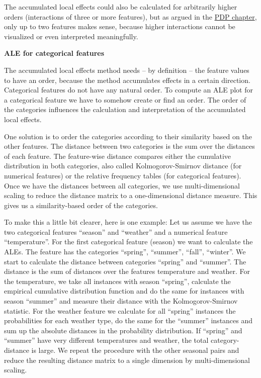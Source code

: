 \documentclass[
  12pt,
]{krantz}
\begin{document}
The accumulated local effects could also be calculated for arbitrarily higher orders (interactions of three or more features), but as argued in the \protect\hyperlink{pdp}{PDP chapter}, only up to two features makes sense, because higher interactions cannot be visualized or even interpreted meaningfully.

\textbf{ALE for categorical features}

The accumulated local effects method needs -- by definition -- the feature values to have an order, because the method accumulates effects in a certain direction.
Categorical features do not have any natural order.
To compute an ALE plot for a categorical feature we have to somehow create or find an order.
The order of the categories influences the calculation and interpretation of the accumulated local effects.

One solution is to order the categories according to their similarity based on the other features.
The distance between two categories is the sum over the distances of each feature.
The feature-wise distance compares either the cumulative distribution in both categories, also called Kolmogorov-Smirnov distance (for numerical features) or the relative frequency tables (for categorical features).
Once we have the distances between all categories, we use multi-dimensional scaling to reduce the distance matrix to a one-dimensional distance measure.
This gives us a similarity-based order of the categories.

To make this a little bit clearer, here is one example:
Let us assume we have the two categorical features ``season'' and ``weather'' and a numerical feature ``temperature''.
For the first categorical feature (season) we want to calculate the ALEs.
The feature has the categories ``spring'', ``summer'', ``fall'', ``winter''.
We start to calculate the distance between categories ``spring'' and ``summer''.
The distance is the sum of distances over the features temperature and weather.
For the temperature, we take all instances with season ``spring'', calculate the empirical cumulative distribution function and do the same for instances with season ``summer'' and measure their distance with the Kolmogorov-Smirnov statistic.
For the weather feature we calculate for all ``spring'' instances the probabilities for each weather type, do the same for the ``summer'' instances and sum up the absolute distances in the probability distribution.
If ``spring'' and ``summer'' have very different temperatures and weather, the total category-distance is large.
We repeat the procedure with the other seasonal pairs and reduce the resulting distance matrix to a single dimension by multi-dimensional scaling.
\end{document}
